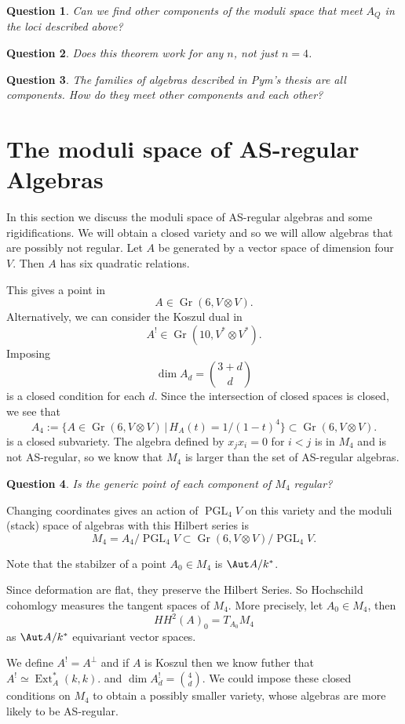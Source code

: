 \documentclass{article}
\newtheorem{question}{Question}
\DeclareMathOperator{\PGL}{PGL}
\DeclareMathOperator{\Gr}{Gr}
\DeclareMathOperator{\Ext}{Ext}
\begin{document}
\begin{question}
Can we find other components of the moduli space that meet $A_Q$ in the loci described above?
\end{question}
\begin{question}
  Does this theorem work for any $n$, not just $n=4$.
\end{question}
\begin{question}
  The families of algebras described in Pym's thesis are all components.  How do they meet other components and each other?
\end{question}

\section{The moduli space of AS-regular Algebras}
In this section we discuss the moduli space of AS-regular algebras and some rigidifications. We will obtain a closed variety and so we will allow algebras that are possibly not regular.
Let $A$ be generated by a vector space of dimension four $V$.
Then $A$ has six quadratic relations.


This gives a point in
$$A \in \Gr(6, V\otimes V).$$  Alternatively, we can consider the Koszul dual in
$$A^! \in \Gr(10, V^*\otimes V^*).$$  Imposing
$$\dim A_d = \binom{3+d}{d}$$
is a closed condition for each $d$.  Since the intersection of closed spaces is closed, we see that
$$ A_4 := \{ A \in \Gr(6,V\otimes V) \,|\, H_A(t) = 1/(1-t)^4\}
\subset \Gr(6,V\otimes V).$$ is a closed subvariety.
The algebra defined by $x_jx_i = 0$ for $i<j$ is in $M_4$ and is not AS-regular, so we know that $M_4$ is larger than the set of AS-regular algebras.
\begin{question} Is the generic point of each component of $M_4$ regular?
  \end{question}
Changing coordinates gives an action of
$\PGL_4V$ on this variety and the moduli (stack) space
of algebras with this Hilbert series is
$$ M_4 = A_4/\PGL_4V \subset \Gr(6,V\otimes V)/\PGL_4 V.$$

Note that the stabilzer of a point $A_0 \in M_4$ is $\Aut A/k^*$.

Since deformation are flat, they preserve the Hilbert Series.  So Hochschild cohomlogy measures the tangent spaces of $M_4$.  More precisely, let $A_0 \in M_4$,
then $$HH^2(A)_0 = T_{A_0} M_4$$ as $\Aut A/k^*$ equivariant vector spaces.

We define $A^! = A^\perp$ and if
$A$ is Koszul then we know futher that $A^! \simeq \Ext^*_A(k,k).$
and $\dim A^!_d = \binom{4}{d}$.  We could impose these closed conditions on $M_4$ to obtain a possibly smaller variety, whose algebras are more likely to be AS-regular.
\end{document}
